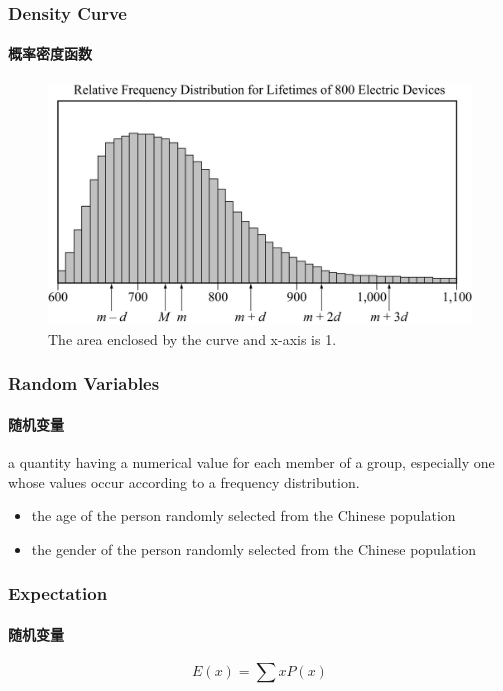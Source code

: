 \documentclass[
	11pt, %
]{beamer}
\begin{document}
\begin{frame}
	\frametitle{Density Curve}
	\framesubtitle{概率密度函数}
	\begin{figure}
		\includegraphics[width=0.8\linewidth]{Density_Curve.jpg}
		\caption{The area enclosed by the curve and x-axis is 1.}
	\end{figure}
\end{frame}



\begin{frame}
	\frametitle{Random Variables}
	\framesubtitle{随机变量}
	\begin{definition}
		a quantity having a numerical value for each member of a group, especially one whose values occur according to a frequency distribution.
	\end{definition}
	\begin{example}
		\begin{itemize}
			\item the age of the person randomly selected from the Chinese population
			\item the gender of the person randomly selected from the Chinese  population
		\end{itemize}
	\end{example}
\end{frame}


\begin{frame}
	\frametitle{Expectation}
	\framesubtitle{随机变量}
	\begin{definition}
		\begin{equation*}
			E(x) = \sum x P(x)
		\end{equation*}
	\end{definition}
\end{frame}

\end{document}
